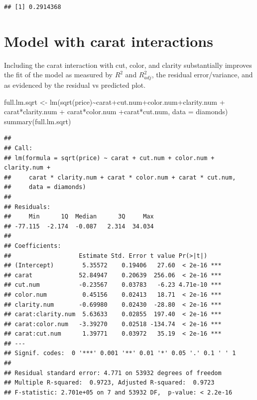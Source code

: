 \documentclass[
]{book}
\newenvironment{Shaded}{\begin{snugshade}}{\end{snugshade}}
\newcommand{\AttributeTok}[1]{\textcolor[rgb]{0.77,0.63,0.00}{#1}}
\newcommand{\FunctionTok}[1]{\textcolor[rgb]{0.00,0.00,0.00}{#1}}
\newcommand{\NormalTok}[1]{#1}
\newcommand{\OtherTok}[1]{\textcolor[rgb]{0.56,0.35,0.01}{#1}}
\newcommand{\SpecialCharTok}[1]{\textcolor[rgb]{0.00,0.00,0.00}{#1}}
\begin{document}
\begin{Shaded}
\end{Shaded}

\begin{verbatim}
## [1] 0.2914368
\end{verbatim}

\hypertarget{model-with-carat-interactions}{%
\section{Model with carat interactions}\label{model-with-carat-interactions}}

Including the carat interaction with cut, color, and clarity substantially improves the fit of the model as measured by \(R^2\) and \(R^2_{adj}\), the residual error/variance, and as evidenced by the residual vs predicted plot.

\begin{Shaded}
\begin{Highlighting}[]
\NormalTok{full.lm.sqrt }\OtherTok{\textless{}{-}} \FunctionTok{lm}\NormalTok{(}\FunctionTok{sqrt}\NormalTok{(price)}\SpecialCharTok{\textasciitilde{}}\NormalTok{carat}\SpecialCharTok{+}\NormalTok{cut.num}\SpecialCharTok{+}\NormalTok{color.num}\SpecialCharTok{+}\NormalTok{clarity.num }\SpecialCharTok{+}\NormalTok{ carat}\SpecialCharTok{*}\NormalTok{clarity.num }\SpecialCharTok{+}\NormalTok{ carat}\SpecialCharTok{*}\NormalTok{color.num }\SpecialCharTok{+}\NormalTok{carat}\SpecialCharTok{*}\NormalTok{cut.num, }\AttributeTok{data =}\NormalTok{ diamonds)}
\FunctionTok{summary}\NormalTok{(full.lm.sqrt)}
\end{Highlighting}
\end{Shaded}

\begin{verbatim}
## 
## Call:
## lm(formula = sqrt(price) ~ carat + cut.num + color.num + clarity.num + 
##     carat * clarity.num + carat * color.num + carat * cut.num, 
##     data = diamonds)
## 
## Residuals:
##     Min      1Q  Median      3Q     Max 
## -77.115  -2.174  -0.087   2.314  34.034 
## 
## Coefficients:
##                   Estimate Std. Error t value Pr(>|t|)    
## (Intercept)        5.35572    0.19406   27.60  < 2e-16 ***
## carat             52.84947    0.20639  256.06  < 2e-16 ***
## cut.num           -0.23567    0.03783   -6.23 4.71e-10 ***
## color.num          0.45156    0.02413   18.71  < 2e-16 ***
## clarity.num       -0.69980    0.02430  -28.80  < 2e-16 ***
## carat:clarity.num  5.63633    0.02855  197.40  < 2e-16 ***
## carat:color.num   -3.39270    0.02518 -134.74  < 2e-16 ***
## carat:cut.num      1.39771    0.03972   35.19  < 2e-16 ***
## ---
## Signif. codes:  0 '***' 0.001 '**' 0.01 '*' 0.05 '.' 0.1 ' ' 1
## 
## Residual standard error: 4.771 on 53932 degrees of freedom
## Multiple R-squared:  0.9723, Adjusted R-squared:  0.9723 
## F-statistic: 2.701e+05 on 7 and 53932 DF,  p-value: < 2.2e-16
\end{verbatim}
\end{document}
